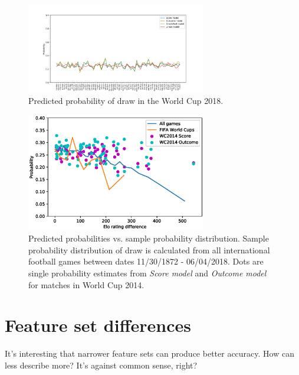 \begin{figure}[H]
    \centering
    \includegraphics[width=0.7\textwidth]{img/match_level_2018_model_probability_draw_prob.png}
    \caption{Predicted probability of draw in the World Cup 2018.}
    \label{fig:draw_probability}
\end{figure}

\begin{figure}[H]
    \centering
    \includegraphics[width=0.7\textwidth]{img/draw_true_probability_wc.eps}
    \caption{Predicted probabilities vs. sample probability distribution. Sample probability distribution of draw is calculated from all international football games between dates 11/30/1872 - 06/04/2018. Dots are single probability estimates from \textit{Score model} and \textit{Outcome model} for matches in World Cup 2014.}
    \label{fig:draw_prob_dist}
\end{figure}


\section{Feature set differences}
It's interesting that narrower feature sets can produce better accuracy. How can less describe more? It's against common sense, right?

